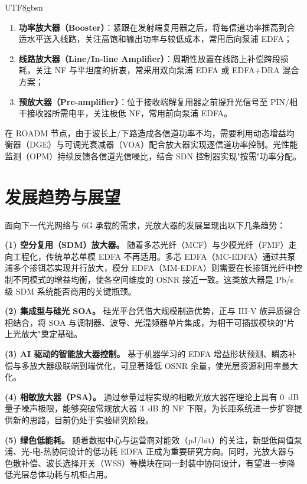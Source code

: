\documentclass[11pt,a4paper]{article}
\begin{document}
\begin{CJK}{UTF8}{gbsn}
\begin{enumerate}[leftmargin=2.5em,itemsep=2pt]
\item \textbf{功率放大器（Booster）}：紧跟在发射端复用器之后，将每信道功率推高到合适水平送入线路，关注高饱和输出功率与较低成本，常用后向泵浦 EDFA；
\item \textbf{线路放大器（Line/In-line Amplifier）}：周期性放置在线路上补偿跨段损耗，关注 NF 与平坦度的折衷，常采用双向泵浦 EDFA 或 EDFA+DRA 混合方案；
\item \textbf{预放大器（Pre-amplifier）}：位于接收端解复用器之前提升光信号至 PIN/相干接收器所需电平，关注极低 NF，常用前向泵浦 EDFA。
\end{enumerate}

在 ROADM 节点，由于波长上/下路造成各信道功率不均，需要利用动态增益均衡器（DGE）与可调光衰减器（VOA）配合放大器实现逐信道功率控制。光性能监测（OPM）持续反馈各信道光信噪比，结合 SDN 控制器实现"按需"功率分配。

\section{发展趋势与展望}

面向下一代光网络与 6G 承载的需求，光放大器的发展呈现出以下几条趋势：

\textbf{(1) 空分复用（SDM）放大器。} 随着多芯光纤（MCF）与少模光纤（FMF）走向工程化，传统单芯单模 EDFA 不再适用。多芯 EDFA（MC-EDFA）通过共泵浦多个掺铒芯实现并行放大，模分 EDFA（MM-EDFA）则需要在长掺铒光纤中控制不同模式的增益均衡，使各空间维度的 OSNR 接近一致。这类放大器是 Pb/s 级 SDM 系统能否商用的关键瓶颈\cite{renaudier2022}。

\textbf{(2) 集成型与硅光 SOA。} 硅光平台凭借大规模制造优势，正与 III-V 族异质键合相结合，将 SOA 与调制器、波导、光混频器单片集成，为相干可插拔模块的"片上光放大"奠定基础。

\textbf{(3) AI 驱动的智能放大器控制。} 基于机器学习的 EDFA 增益形状预测、瞬态补偿与多放大器级联端到端优化，可显著降低 OSNR 余量，使光层资源利用率最大化。

\textbf{(4) 相敏放大器（PSA）。} 通过参量过程实现的相敏光放大器在理论上具有 0~dB 量子噪声极限，能够突破常规放大器 3~dB 的 NF 下限，为长距系统进一步扩容提供新的思路，目前仍处于实验研究阶段。

\textbf{(5) 绿色低能耗。} 随着数据中心与运营商对能效（pJ/bit）的关注，新型低阈值泵浦、光-电-热协同设计的低功耗 EDFA 正成为重要研究方向。同时，光放大器与色散补偿、波长选择开关（WSS）等模块在同一封装中协同设计，有望进一步降低光层总体功耗与机柜占用。


\end{CJK}
\end{document}
